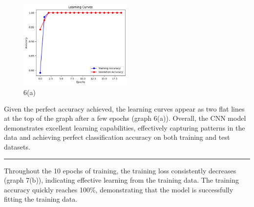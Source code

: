 \documentclass[a4paper,10 pt]{article}
\begin{document}
  \vspace{12pt}



  \begin{figure}[H]
    \centering
    \includegraphics[width=0.5\textwidth]{graphQ6r.png} %
    \caption{6(a)}
  \end{figure}

  \vspace{12pt}

  Given the perfect accuracy achieved, the learning curves appear as two flat lines at the top of the graph after a few epochs (graph 6(a)). Overall, the CNN model demonstrates excellent learning capabilities, effectively capturing patterns in the data and achieving perfect classification accuracy on both training and test datasets.

  \vspace{12pt}

  \hrule

  \vspace{12pt}

  Throughout the 10 epochs of training, the training loss consistently decreases (graph 7(b)), indicating effective learning from the training data. The training accuracy quickly reaches 100\%, demonstrating that the model is successfully fitting the training data.

  \vspace{12pt}
\end{document}
